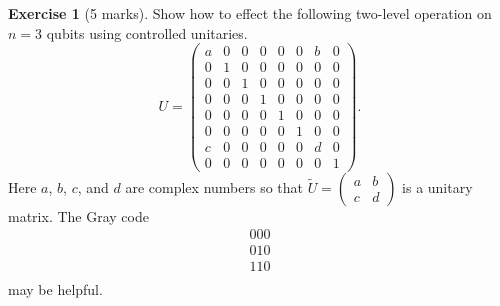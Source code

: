\documentclass[12pt,oneside]{amsart}
\theoremstyle{plain}%
\theoremstyle{definition}
\newtheorem{exercise}{\color{cgblue}Exercise}[section]
\theoremstyle{remark}
\begin{document}
\begin{exercise}[5 marks]
  Show how to effect the following two-level operation on $n=3$ qubits using controlled unitaries.
  \begin{equation}
    U = \begin{pmatrix}
      a & 0 & 0 & 0 & 0 & 0 & b & 0 \\
      0 & 1 & 0 & 0 & 0 & 0 & 0 & 0 \\
      0 & 0 & 1 & 0 & 0 & 0 & 0 & 0 \\
      0 & 0 & 0 & 1 & 0 & 0 & 0 & 0 \\
      0 & 0 & 0 & 0 & 1 & 0 & 0 & 0 \\
      0 & 0 & 0 & 0 & 0 & 1 & 0 & 0 \\
      c & 0 & 0 & 0 & 0 & 0 & d & 0 \\
      0 & 0 & 0 & 0 & 0 & 0 & 0 & 1 
    \end{pmatrix}.
  \end{equation}
  Here $a$, $b$, $c$, and $d$ are complex numbers so that $\widetilde{U}=\left(\begin{smallmatrix} a & b\\ c & d \end{smallmatrix}\right)$ is a unitary matrix. The Gray code 
  \begin{equation}
  \begin{matrix}
    000 \\
    010 \\
    110 \\
  \end{matrix}
\end{equation}
may be helpful.
\end{exercise} 
\end{document}
